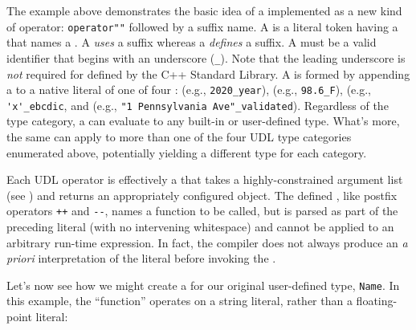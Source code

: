 \noindent The example above demonstrates the basic idea of a  implemented as a new kind of operator:
\lstinline!operator""! followed by a suffix name. A  is a
literal token having a  that names a . A  \emph{uses} a suffix whereas a  \emph{defines} a suffix. A  must be a valid
identifier that begins with an underscore (\lstinline!_!). Note that the
leading underscore is \emph{not} required for 
defined by the C++ Standard Library. A  is formed by
appending a  to a native literal of one of four
:  (e.g.,
\lstinline!2020_year!),  (e.g.,
\lstinline!98.6_F!),  (e.g.,
\lstinline!'x'_ebcdic!, and  (e.g.,
\lstinline!"1!~\lstinline!Pennsylvania!~\lstinline!Ave"_validated!). Regardless
of the type category, a  can evaluate to any built-in or
user-defined type. What's more, the same  can apply
to more than one of the four UDL type categories enumerated above,
potentially yielding a different type for each category.

Each UDL operator is effectively a  that takes
a highly-constrained argument list (see ) 
and returns an
appropriately configured object. The defined , like
postfix operators \lstinline!++! and \lstinline!--!, names a function to be
called, but is parsed as part of the preceding literal (with no
intervening whitespace) and cannot be applied to an arbitrary run-time
expression. In fact, the compiler does not always produce an \emph{a
priori} interpretation of the literal before invoking the .

Let's now see how we might create a  for our original
user-defined type, \lstinline!Name!. In this example, the 
``function'' operates on a string literal, rather than a floating-point
literal:

